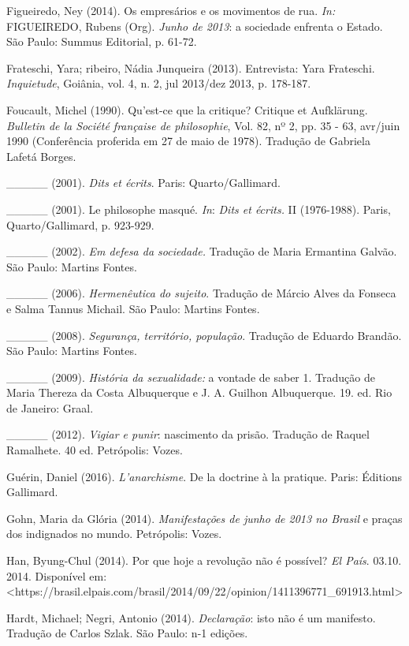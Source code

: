 Figueiredo, Ney (2014). Os empresários e os movimentos de rua. \emph{In:
}FIGUEIREDO, Rubens (Org). \emph{Junho de 2013}: a sociedade enfrenta o
Estado. São Paulo: Summus Editorial, p. 61-72.

Frateschi, Yara; ribeiro, Nádia Junqueira (2013). Entrevista: Yara
Frateschi. \emph{Inquietude}, Goiânia, vol. 4, n. 2, jul 2013/dez 2013,
p. 178-187.

Foucault, Michel (1990). Qu'est-ce que la critique? Critique et
Aufklärung. \emph{Bulletin de la Société française de philosophie}, Vol.
82, nº 2, pp. 35 - 63, avr/juin 1990 (Conferência proferida em 27 de
maio de 1978). Tradução de Gabriela Lafetá Borges.

\_\_\_\_\_ (2001). \emph{Dits et écrits}. Paris: Quarto/Gallimard.

\_\_\_\_\_ (2001). Le philosophe masqué. \emph{In}: \emph{Dits et
écrits. }II (1976-1988). Paris, Quarto/Gallimard, p. 923-929.

\_\_\_\_\_ (2002). \emph{Em defesa da sociedade.} Tradução de Maria
Ermantina Galvão. São Paulo: Martins Fontes.

\_\_\_\_\_ (2006). \emph{Hermenêutica do sujeito}. Tradução de Márcio
Alves da Fonseca e Salma Tannus Michail. São Paulo: Martins Fontes.

\_\_\_\_\_ (2008). \emph{Segurança, território, população}. Tradução de
Eduardo Brandão. São Paulo: Martins Fontes.

\_\_\_\_\_ (2009). \emph{História da sexualidade:} a vontade de saber 1.
Tradução de Maria Thereza da Costa Albuquerque e J. A. Guilhon
Albuquerque. 19. ed. Rio de Janeiro: Graal.

\_\_\_\_\_ (2012). \emph{Vigiar e punir}: nascimento da prisão. Tradução
de Raquel Ramalhete. 40 ed. Petrópolis: Vozes.

Guérin, Daniel (2016). \emph{L'anarchisme}. De la doctrine à la
pratique. Paris: Éditions Gallimard.

Gohn, Maria da Glória (2014). \emph{Manifestações de junho de 2013 no
Brasil} e praças dos indignados no mundo. Petrópolis: Vozes.

Han, Byung-Chul (2014). Por que hoje a revolução não é possível?
\emph{El País}. 03.10. 2014. Disponível em:
\textless{}https://brasil.elpais.com/brasil/2014/09/22/opinion/1411396771\_691913.html\textgreater{}

Hardt, Michael; Negri, Antonio (2014). \emph{Declaração}: isto não é um
manifesto. Tradução de Carlos Szlak. São Paulo: n-1 edições.

